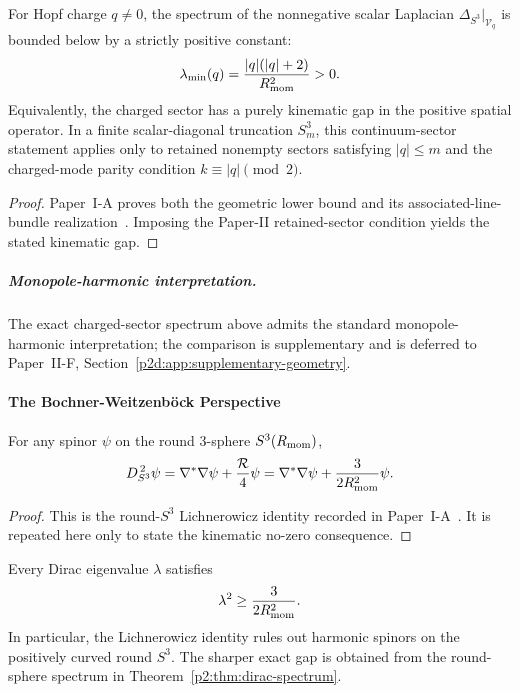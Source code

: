 \documentclass[12pt,a4paper]{article}
\begin{document}
\begin{theorem}
\label{p2:thm:hopf-charge-spectral-gap}
For Hopf charge $q \neq 0$, the spectrum of the nonnegative scalar Laplacian $\Delta_{S^3}|_{\mathcal{V}_q}$ is bounded below by a strictly positive constant:
\begin{equation}
\lambda_{\min}(q) = \frac{|q|(|q|+2)}{R_{\mathrm{mom}}^2} > 0.
\label{p2:eq:hopf-charge-spectral-gap}
\end{equation}
Equivalently, the charged sector has a purely kinematic gap in the positive spatial operator.  In a finite scalar-diagonal truncation \(S^3_m\), this continuum-sector statement applies only to retained nonempty sectors satisfying \(|q|\le m\) and the charged-mode parity condition \(k\equiv |q|\pmod 2\).
\end{theorem}

\begin{proof}
Paper~I-A proves both the geometric lower bound and its associated-line-bundle
realization~\cite{Kugelmann2026a}.  Imposing the Paper-II retained-sector
condition yields the stated kinematic gap.
\end{proof}


\subparagraph{Monopole-harmonic interpretation.}
The exact charged-sector spectrum above admits the standard monopole-harmonic
interpretation; the comparison is supplementary and is deferred to
Paper~II-F, Section~\ref{p2d:app:supplementary-geometry}.

\paragraph{The Bochner-Weitzenböck Perspective}

\begin{theorem}
\label{p2:thm:lichnerowicz}
For any spinor $\psi$ on the round 3-sphere $S^3(R_{\mathrm{mom}})$,
\begin{equation}
D_{S^3}^{\,2}\psi = \nabla^*\nabla\psi + \frac{\mathcal R}{4}\psi = \nabla^*\nabla\psi + \frac{3}{2R_{\mathrm{mom}}^2}\psi.
\end{equation}
\end{theorem}

\begin{proof}
This is the round-\(S^3\) Lichnerowicz identity recorded in
Paper~I-A~\cite{Kugelmann2026a}.  It is repeated here only to state the
kinematic no-zero consequence.
\end{proof}

\begin{corollary}
\label{p2:cor:fermion-gap}
Every Dirac eigenvalue $\lambda$ satisfies
\[
\lambda^2\ge \frac{3}{2R_{\mathrm{mom}}^2}.
\]
In particular, the Lichnerowicz identity rules out harmonic spinors on the positively curved round $S^3$. The sharper exact gap is obtained from the round-sphere spectrum in Theorem~\ref{p2:thm:dirac-spectrum}.
\end{corollary}
\end{document}
